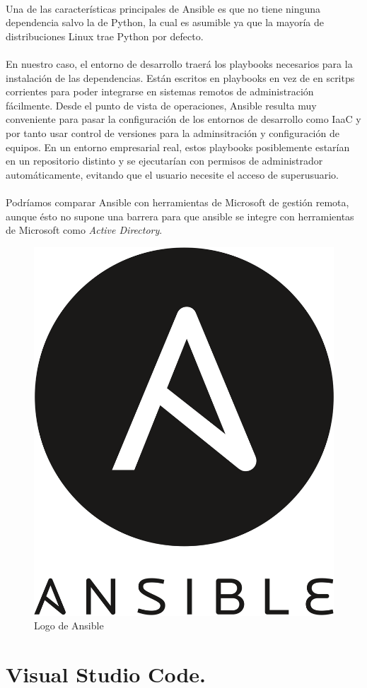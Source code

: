 \paragraph{}Una de las características principales de Ansible es que no tiene ninguna
dependencia salvo la de Python, la cual es asumible ya que la mayoría
de distribuciones Linux trae Python por defecto.

\paragraph{}En nuestro caso, el entorno de desarrollo traerá los playbooks necesarios
para la instalación de las dependencias. Están escritos en playbooks en vez de en scritps
corrientes para poder integrarse en sistemas remotos de administración fácilmente. Desde
el punto de vista de operaciones, Ansible resulta muy conveniente para pasar la configuración
de los entornos de desarrollo como \gls{IaaC} y por tanto usar control de versiones para
la adminsitración y configuración de equipos. En un entorno empresarial real, estos
playbooks posiblemente estarían en un repositorio distinto y se ejecutarían con permisos
de administrador automáticamente, evitando que el usuario necesite el acceso de superusuario.

\paragraph{}Podríamos comparar Ansible con herramientas de Microsoft de gestión remota,
aunque ésto no supone una barrera para que ansible se integre con herramientas de Microsoft
como \emph{Active Directory}.

\begin{figure}[H]
	\centering
	\includegraphics[width=0.30\linewidth]{imgs/ansible-logo}
	\caption[Ansible Logo]{Logo de Ansible}
	\label{fig:ansible}
\end{figure}

\section{Visual Studio Code.}\label{sec:vscode}

